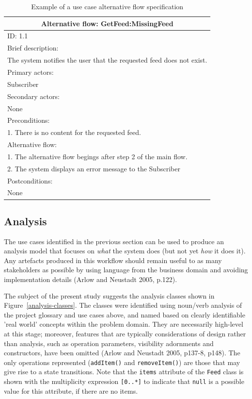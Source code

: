 \documentclass{article}
\begin{document}
\begin{table}[]
\begin{center}
\begin{tabular}{ | p{\textwidth} |}
\hline
\multicolumn{1}{|c|}{Alternative flow: GetFeed:MissingFeed} \\
\hline
ID: 1.1 \\
\hline
Brief description: \\
The system notifies the user that the requested feed does not exist. \\
\hline
Primary actors: \\
Subscriber \\
\hline
Secondary actors: \\
None \\
\hline
Preconditions: \\
1. There is no content for the requested feed. \\
\hline
Alternative flow: \\
1. The alternative flow begings after step 2 of the main flow. \\
2. The system displays an error message to the Subscriber \\
\hline
Postconditions: \\
None \\
\hline
\end{tabular}
\end{center}
\caption{Example of a use case alternative flow specification}
\label{use-case-alt-detail}
\end{table}

\subsection{Analysis}

The use cases identified in the previous section can be used to produce an analysis model that focuses on \textit{what} the system does (but not yet \textit{how} it does it). Any artefacts produced in this workflow should remain useful to as many stakeholders as possible by using language from the business domain and avoiding implementation details (Arlow and Neustadt 2005, p.122).

The subject of the present study suggests the analysis classes shown in Figure~\ref{analysis-classes}. The classes were identified using noun/verb analysis of the project glossary and use cases above, and named based on clearly identifiable 'real world' concepts within the problem domain. They are necessarily high-level at this stage; moreover, features that are typically considerations of design rather than analysis, such as operation parameters, visibility adornments and constructors, have been omitted (Arlow and Neustadt 2005, p137-8, p148). The only operations represented (\texttt{addItem()} and \texttt{removeItem()}) are those that may give rise to a state transitions. Note that the \texttt{items} attribute of the \texttt{Feed} class is shown with the multiplicity expression \texttt{[0..*]} to indicate that \texttt{null} is a possible value for this attribute, if there are no items.
\end{document}
